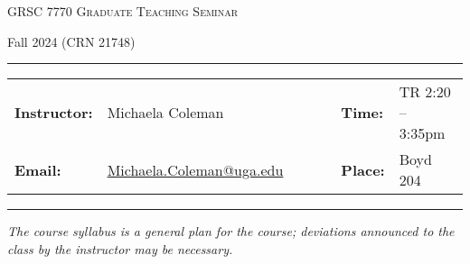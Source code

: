 \documentclass[11pt, a4paper]{article}
\begin{document}
\begin{center}
{\Large \textsc{GRSC 7770 Graduate Teaching Seminar}}
\end{center}
\begin{center}
Fall 2024 (CRN 21748)
\end{center}


\begin{center}
\rule{6in}{0.4pt}
\begin{minipage}[t]{.75\textwidth}
\begin{tabular}{llcccll}
\textbf{Instructor:} & Michaela Coleman & & &  & \textbf{Time:} & TR 2:20 -- 3:35pm \\
\textbf{Email:} &  \href{Michaela Coleman}{Michaela.Coleman@uga.edu} & & & & \textbf{Place:} & Boyd 204
\end{tabular}
\end{minipage}
\rule{6in}{0.4pt}
\end{center}
\vspace{.5cm}
\setlength{\unitlength}{1in}
\renewcommand{\arraystretch}{2}

\textit{The course syllabus is a general plan for the course; deviations
announced to the class by the instructor may be necessary.}
\end{document}
